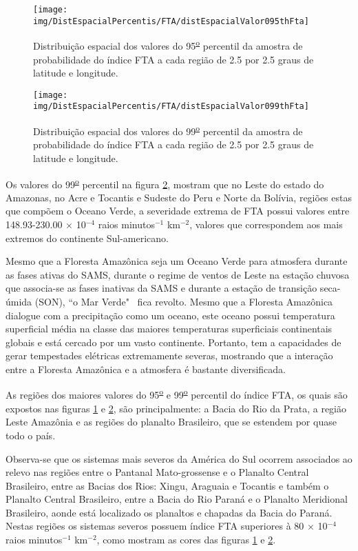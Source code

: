 \begin{figure}[!ht]
\centering
{\texttt{[image: img/DistEspacialPercentis/FTA/distEspacialValor095thFta]}} 
\caption{Distribuição espacial dos valores do 95\textsuperscript{\underline{o}} percentil da amostra de probabilidade do índice FTA a cada região de 2.5 por 2.5 graus de latitude e longitude.}
\label{95oFta}
\end{figure} 
  
\begin{figure}[!ht]
\centering  
{\texttt{[image: img/DistEspacialPercentis/FTA/distEspacialValor099thFta]}}
\caption{Distribuição espacial dos valores do  99\textsuperscript{\underline{o}} percentil da amostra de probabilidade do índice FTA a cada região de 2.5 por 2.5 graus de latitude e longitude.}
\label{99oFta}
\end{figure} 


Os valores do 99\textsuperscript{\underline{o}} percentil na figura \ref{99oFta}, mostram que no Leste do estado do Amazonas, no Acre e Tocantis e Sudeste do Peru e Norte da Bolívia, regiões estas que compõem o Oceano Verde, a severidade extrema de FTA possui valores entre 148.93-230.00  $\times$ 10$^{-4}$ raios minutos$^{-1}$ km$^{-2}$,  valores que correspondem aos mais extremos do continente Sul-americano. 

Mesmo que a Floresta Amazônica seja um Oceano Verde para atmosfera durante as fases ativas do SAMS, durante o regime de ventos de Leste na estação chuvosa que associa-se as fases inativas da SAMS e durante a estação de transição seca-úmida (SON), ``o Mar Verde"  ~fica revolto. Mesmo que a Floresta Amazônica dialogue com a precipitação como um oceano, este oceano possui temperatura superficial média na classe das maiores temperaturas superficiais continentais globais e está cercado por um vasto continente. Portanto, tem a capacidades de gerar tempestades elétricas extremamente severas, mostrando que a interação entre a Floresta Amazônica e a atmosfera é bastante diversificada.

As regiões dos maiores valores do 95\textsuperscript{\underline{o}} e 99\textsuperscript{\underline{o}} percentil do índice FTA, os quais são  expostos nas figuras \ref{95oFta} e \ref{99oFta}, são principalmente: a Bacia do Rio da Prata, a região Leste Amazônia e as regiões  do planalto Brasileiro, que se estendem por quase todo o país.

Observa-se que os sistemas mais severos da América do Sul ocorrem associados ao relevo nas regiões entre o Pantanal Mato-grossense e o Planalto Central Brasileiro, entre as Bacias dos Rios: Xingu, Araguaia e Tocantis e também o Planalto Central Brasileiro, entre a Bacia do Rio Paraná e o Planalto Meridional Brasileiro, aonde está localizado os planaltos e chapadas da Bacia do Paraná. Nestas regiões os sistemas severos possuem índice FTA superiores à 80 $\times$ 10$^{-4}$ raios minutos$^{-1}$ km$^{-2}$, como mostram as cores das figuras \ref{95oFta} e \ref{99oFta}. 

